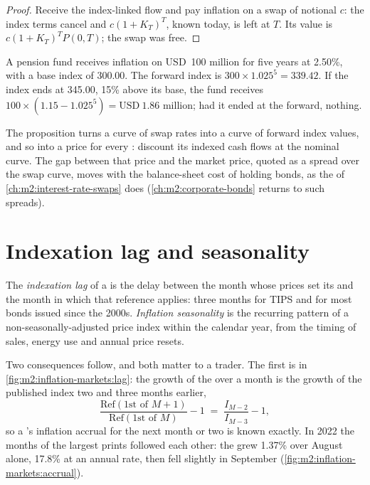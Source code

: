 \begin{proof}
Receive the index-linked flow and pay inflation on a swap of notional $c$:
the index terms cancel and $c(1+K_T)^T$, known today, is left at $T$. Its
value is $c(1+K_T)^T P(0,T)$; the swap was free.
\end{proof}

\begin{example}\label{ex:m2:inflation-markets:swap}
A pension fund receives inflation on USD~100 million for five years at 2.50\%,
with a base index of 300.00. The forward index is $300 \times 1.025^5 = 339.42$.
If the index ends at 345.00, 15\% above its base, the fund receives
$100 \times (1.15 - 1.025^5) = \text{USD}~1.86$ million; had it ended at the
forward, nothing.
\end{example}

The proposition turns a curve of swap rates into a curve of forward index
values, and so into a price for every : discount its indexed cash flows
at the nominal curve. The gap between that price and the market price, quoted
as a spread over the swap curve, moves with the balance-sheet cost of holding
bonds, as the  of \cref{ch:m2:interest-rate-swaps} does
(\cref{ch:m2:corporate-bonds} returns to such spreads).

\section{Indexation lag and seasonality}

\begin{definition}\label{def:m2:inflation-markets:lag}
The \emph{indexation lag} of a  is the delay between
the month whose prices set its  and the month in which that
reference applies: three months for TIPS and for most bonds issued since the
2000s. \emph{Inflation seasonality} is the recurring
pattern of a non-seasonally-adjusted price index within the calendar year,
from the timing of sales, energy use and annual price resets.
\end{definition}

Two consequences follow, and both matter to a trader. The first is in
\cref{fig:m2:inflation-markets:lag}: the growth of the  over a
month is the growth of the published index two and three months earlier,
\begin{equation}\label{eq:m2:inflation-markets:accrual}
\frac{\mathrm{Ref}(\text{1st of } M+1)}{\mathrm{Ref}(\text{1st of } M)} - 1 \;=\; \frac{I_{M-2}}{I_{M-3}} - 1,
\end{equation}
so a 's inflation accrual for the next month or two is known exactly. In
2022 the months of the largest prints followed each other: the 
grew 1.37\% over August alone, 17.8\% at an annual rate, then fell slightly in
September (\cref{fig:m2:inflation-markets:accrual}).

